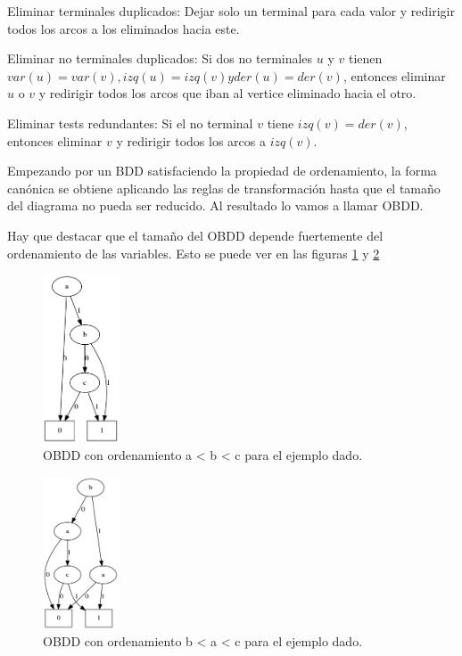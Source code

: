 Eliminar terminales duplicados: Dejar solo un terminal para cada valor y redirigir todos los arcos a los eliminados hacia este.

Eliminar no terminales duplicados: Si dos no terminales $u$ y $v$ tienen $var(u) = var(v), izq(u) = izq(v) y der(u) = der(v)$, entonces eliminar $u$ o $v$ y redirigir todos los arcos que iban al vertice eliminado hacia el otro.

Eliminar tests redundantes: Si el no terminal $v$ tiene $izq(v) = der(v)$, entonces eliminar $v$ y redirigir todos los arcos a $izq(v)$.

Empezando por un BDD satisfaciendo la propiedad de ordenamiento, la forma canónica se obtiene aplicando las reglas de transformación hasta que el tamaño del diagrama no pueda ser reducido. Al resultado lo vamos a llamar OBDD.

Hay que destacar que el tamaño del OBDD depende fuertemente del ordenamiento de las variables. Esto se puede ver en las figuras \ref{fig:gord1} y \ref{fig:bord1}
\begin{figure}[H]
  \centering
  \includegraphics[width=0.2\textwidth]{Figures/goodorder.png}
  \caption{OBDD con ordenamiento a < b < c para el ejemplo dado.}
  \label{fig:gord1}
\end{figure}
\begin{figure}[H]
  \centering
  \includegraphics[width=0.2\textwidth]{Figures/badorder.png}
  \caption{OBDD con ordenamiento b < a < c para el ejemplo dado.}
  \label{fig:bord1}
\end{figure}

